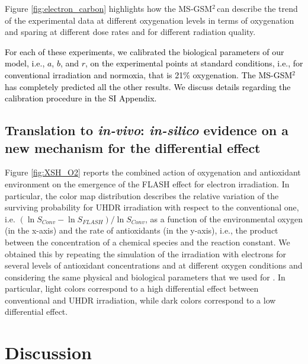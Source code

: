 \documentclass[10pt]{iopart}
\newcommand{\gsm}{MS-GSM$^2\,$}
\newcommand{\marco}[1]{\textcolor{black}{#1}}
\numberwithin{table}{section}
\begin{document}
Figure \ref{fig:electron_carbon} highlights how the \gsm can describe the trend of the experimental data at different oxygenation levels in terms of oxygenation and sparing at different dose rates and for different radiation quality.

\marco{For each of these experiments, we calibrated the biological parameters of our model, i.e., $a$, $b$, and $r$, on the experimental points at standard conditions, i.e., for conventional irradiation and normoxia, that is 21$\%$ oxygenation. The MS-GSM$^2$ has completely predicted all the other results. We discuss details regarding the calibration procedure in the SI Appendix.}

\subsection*{Translation to \textit{in-vivo}: \textit{in-silico} evidence on a new mechanism for the differential effect}\label{SEC:DifEf}

Figure \ref{fig:XSH_O2} reports the combined action of oxygenation and antioxidant environment on the emergence of the FLASH effect for electron irradiation. In particular, the color map distribution describes the relative variation of the surviving probability for UHDR irradiation with respect to the conventional one, i.e. $(\ln{S_{Conv}}-\ln{S_{FLASH}})/\ln{S_{Conv}}$, as a function of the environmental oxygen (in the x-axis) and the rate of antioxidants (in the y-axis), i.e., the product between the concentration of a chemical species and the reaction constant. We obtained this by repeating the simulation of the irradiation with electrons for several levels of antioxidant concentrations and at different oxygen conditions and considering the same physical and biological parameters that we used for \cite{Adrian2020}. In particular, light colors correspond to a high differential effect between conventional and UHDR irradiation, while dark colors correspond to a low differential effect.

\section*{Discussion}
\end{document}

